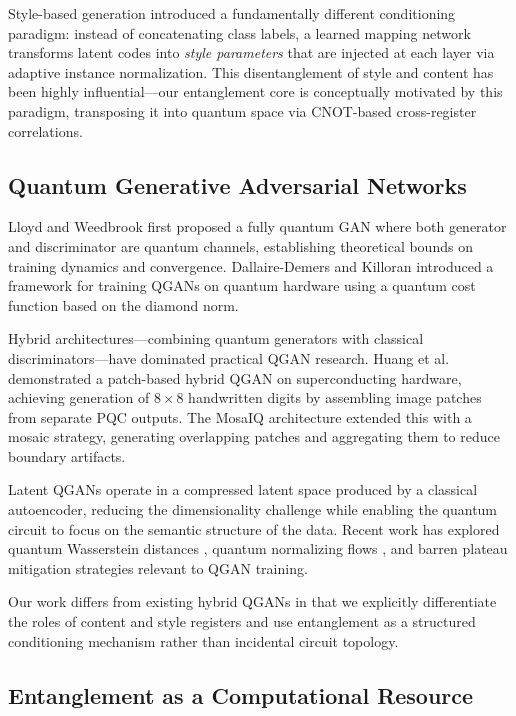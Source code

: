 \documentclass[twocolumn]{article}
\begin{document}
Style-based generation \cite{karras2019style, karras2020analyzing} introduced
a fundamentally different conditioning paradigm: instead of concatenating class
labels, a learned mapping network transforms latent codes into \emph{style
parameters} that are injected at each layer via adaptive instance normalization.
This disentanglement of style and content has been highly influential—our
entanglement core is conceptually motivated by this paradigm, transposing it
into quantum space via CNOT-based cross-register correlations.

\subsection{Quantum Generative Adversarial Networks}

Lloyd and Weedbrook \cite{lloyd2018quantum} first proposed a fully quantum GAN
where both generator and discriminator are quantum channels, establishing
theoretical bounds on training dynamics and convergence. Dallaire-Demers and
Killoran \cite{dallaire2018quantum} introduced a framework for training QGANs
on quantum hardware using a quantum cost function based on the diamond norm.

Hybrid architectures—combining quantum generators with classical
discriminators—have dominated practical QGAN research. Huang et al.\
\cite{huang2021experimental} demonstrated a patch-based hybrid QGAN on
superconducting hardware, achieving generation of $8\times 8$ handwritten
digits by assembling image patches from separate PQC outputs. The MosaIQ
architecture \cite{tsang2023mosaiq} extended this with a mosaic strategy,
generating overlapping patches and aggregating them to reduce boundary
artifacts.

Latent QGANs \cite{rudolph2024latent} operate in a compressed latent space
produced by a classical autoencoder, reducing the dimensionality challenge
while enabling the quantum circuit to focus on the semantic structure of the
data. Recent work has explored quantum Wasserstein distances
\cite{kiani2022quantum}, quantum normalizing flows
\cite{johansen2024quantum}, and barren plateau mitigation strategies
\cite{mcclean2018barren, zhang2024trainability} relevant to QGAN training.

Our work differs from existing hybrid QGANs in that we explicitly differentiate
the roles of content and style registers and use entanglement as a structured
conditioning mechanism rather than incidental circuit topology.

\subsection{Entanglement as a Computational Resource}
\end{document}
